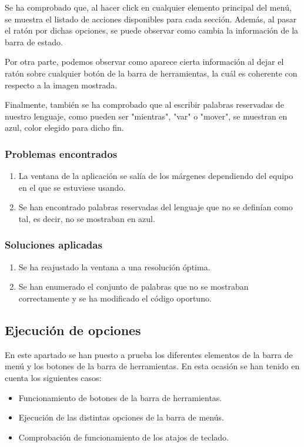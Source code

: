 \documentclass[a4paper, 12pt]{book}
\begin{document}
Se ha comprobado que, al hacer click en cualquier elemento principal del menú, se muestra el listado de acciones disponibles para cada sección.
Además, al pasar el ratón por dichas opciones, se puede observar como cambia la información de la barra de estado.

Por otra parte, podemos observar como aparece cierta información al dejar el ratón sobre cualquier botón de la barra de herramientas, la cuál
es coherente con respecto a la imagen mostrada.

Finalmente, también se ha comprobado que al escribir palabras reservadas de nuestro lenguaje, como pueden ser "mientras", "var" o "mover", se
muestran en azul, color elegido para dicho fin.

\subsubsection*{Problemas encontrados}

\begin{enumerate}
  \item La ventana de la aplicación se salía de los márgenes dependiendo del equipo en el que se estuviese usando.
  \item Se han encontrado palabras reservadas del lenguaje que no se definían como tal, es decir, no se mostraban en azul.
\end{enumerate}

\subsubsection*{Soluciones aplicadas}

\begin{enumerate}
  \item Se ha reajustado la ventana a una resolución óptima.
  \item Se han enumerado el conjunto de palabras que no se mostraban correctamente y se ha modificado el código oportuno.
\end{enumerate}

\subsection{Ejecución de opciones}
En este apartado se han puesto a prueba los diferentes elementos de la barra de menú y los botones de la barra de herramientas. En esta ocasión
se han tenido en cuenta los siguientes casos:

\begin{itemize}
  \item Funcionamiento de botones de la barra de herramientas.
  \item Ejecución de las distintas opciones de la barra de menús.
  \item Comprobación de funcionamiento de los atajos de teclado.
\end{itemize}
\end{document}
